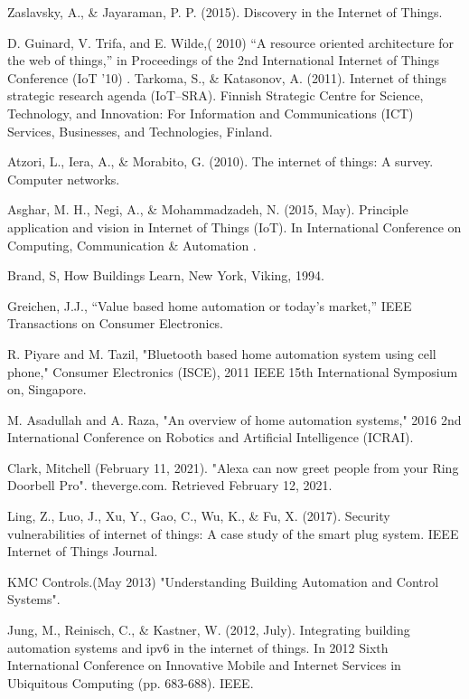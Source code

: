 \documentclass[conference]{IEEEtran}
\begin{document}
\begin{thebibliography}{00}
	
Zaslavsky, A., \& Jayaraman, P. P. (2015). Discovery in the Internet of Things. 
 
 D. Guinard, V. Trifa, and E. Wilde,( 2010) “A resource oriented architecture for the web of things,” in Proceedings of the 2nd International Internet of Things Conference (IoT ’10)
.
 Tarkoma, S., \& Katasonov, A. (2011). Internet of things strategic research agenda (IoT–SRA). Finnish Strategic Centre for Science, Technology, and Innovation: For Information and Communications (ICT) Services, Businesses, and Technologies, Finland.
 
 Atzori, L., Iera, A., \& Morabito, G. (2010). The internet of things: A survey. Computer networks.
 
 Asghar, M. H., Negi, A., \& Mohammadzadeh, N. (2015, May). Principle application and vision in Internet of Things (IoT). In International Conference on Computing, Communication \& Automation .
 
 Brand, S, How Buildings Learn, New York, Viking, 1994. 
 
 Greichen, J.J., “Value based home automation or today's market,” IEEE Transactions on Consumer Electronics.
 
 R. Piyare and M. Tazil, "Bluetooth based home automation system using cell phone," Consumer Electronics (ISCE), 2011 IEEE 15th
International Symposium on, Singapore.

 M. Asadullah and A. Raza, "An overview of home automation systems," 2016 2nd International Conference on Robotics and Artificial Intelligence (ICRAI).

 Clark, Mitchell (February 11, 2021). "Alexa can now greet people from your Ring Doorbell Pro". theverge.com. Retrieved February 12, 2021.

Ling, Z., Luo, J., Xu, Y., Gao, C., Wu, K., \& Fu, X. (2017). Security vulnerabilities of internet of things: A case study of the smart plug system. IEEE Internet of Things Journal.

KMC Controls.(May 2013) "Understanding Building Automation and Control Systems". 

 Jung, M., Reinisch, C., \& Kastner, W. (2012, July). Integrating building automation systems and ipv6 in the internet of things. In 2012 Sixth International Conference on Innovative Mobile and Internet Services in Ubiquitous Computing (pp. 683-688). IEEE.



\end{thebibliography}
\end{document}
